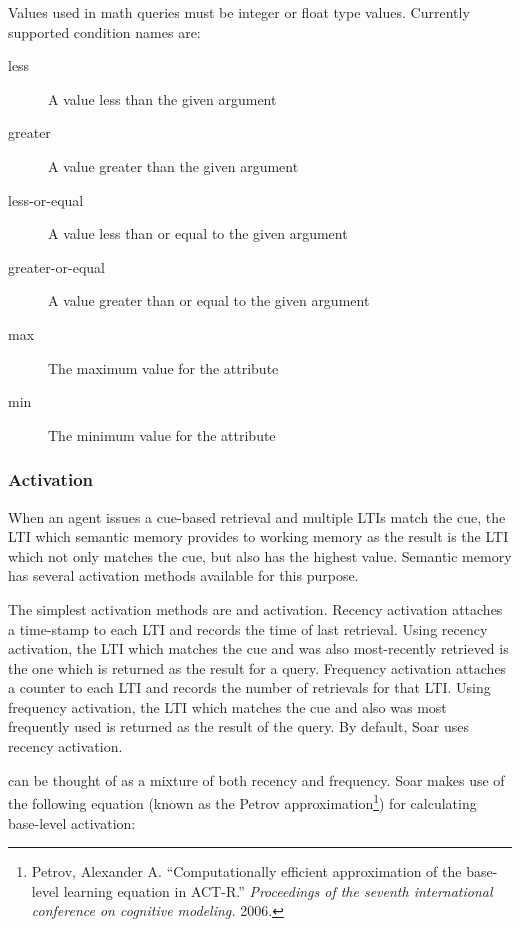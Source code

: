 \begin{itemize}
	Values used in math queries must be integer or float type values.
	Currently supported condition names are:

	\begin{description}
		\item[less] A value less than the given argument
		\item[greater] A value greater than the given argument
		\item[less-or-equal] A value less than or equal to the given argument
		\item[greater-or-equal] A value greater than or equal to the given argument
		\item[max] The maximum value for the attribute
		\item[min] The minimum value for the attribute
	\end{description}
	\vspace{-6pt}
\end{itemize}

\subsubsection{Activation}
\label{SMEM-retrieve-activation}

When an agent issues a cue-based retrieval and multiple LTIs match the cue, the LTI which semantic memory provides to working memory as the result is the LTI which not only matches the cue, but also has the highest  value. Semantic memory has several activation methods available for this purpose.

The simplest activation methods are  and  activation. Recency activation attaches a time-stamp to each LTI and records the time of last retrieval. Using recency activation, the LTI which matches the cue and was also most-recently retrieved is the one which is returned as the result for a query. Frequency activation attaches a counter to each LTI and records the number of retrievals for that LTI. Using frequency activation, the LTI which matches the cue and also was most frequently used is returned as the result of the query. By default, Soar uses recency activation.

 can be thought of as a mixture of both recency and frequency. Soar makes use of the following equation (known as the Petrov approximation\footnote{Petrov, Alexander A. ``Computationally efficient approximation of the base-level learning equation in ACT-R.'' \textit{Proceedings of the seventh international conference on cognitive modeling.} 2006.}) for calculating base-level activation:

